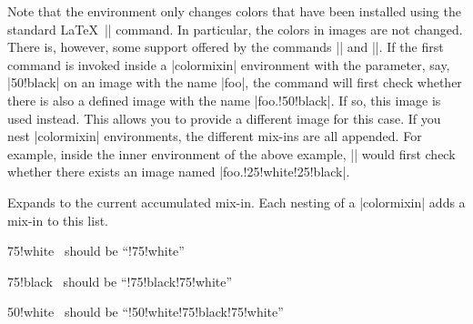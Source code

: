 Note that the environment only changes colors that have been installed using
the standard \LaTeX\ |\color| command. In particular, the colors in images are
not changed. There is, however, some support offered by the commands
|\pgfuseimage| and |\pgfuseshading|. If the first command is invoked inside a
|colormixin| environment with the parameter, say, |50!black| on an image with
the name |foo|, the command will first check whether there is also a defined
image with the name |foo.!50!black|. If so, this image is used instead. This
allows you to provide a different image for this case. If you nest |colormixin|
environments, the different mix-ins are all appended. For example, inside the
inner environment of the above example, || would first check
whether there exists an image named |foo.!25!white!25!black|.

\begin{command}{}
    Expands to the current accumulated mix-in. Each nesting of a |colormixin|
    adds a mix-in to this list.
\begin{codeexample}[preamble={\usepackage{xxcolor}
\usepackage{calc}}]
\begin{minipage}{\linewidth-6pt}\raggedright
\begin{colormixin}{75!white}
  \ should be ``!75!white''\par
  \begin{colormixin}{75!black}
    \ should be ``!75!black!75!white''\par
    \begin{colormixin}{50!white}
      \ should be ``!50!white!75!black!75!white''\par
    \end{colormixin}
  \end{colormixin}
\end{colormixin}
\end{minipage}
\end{codeexample}
\end{command}
